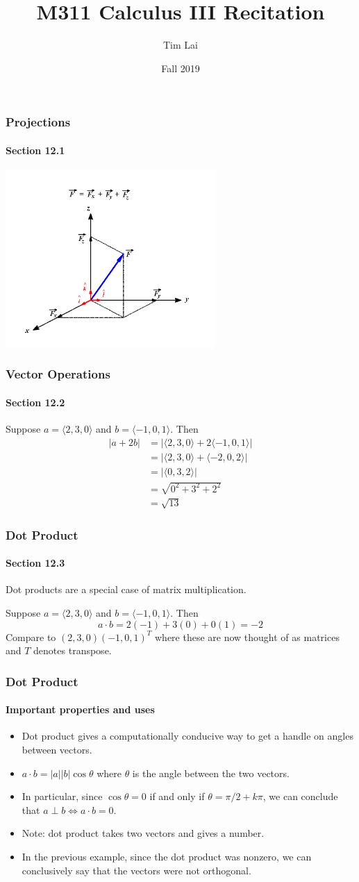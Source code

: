\documentclass[xcolor=svgnames]{beamer}
\begin{document}
\title{M311 Calculus III Recitation}
	\author{Tim Lai }
	\date{Fall 2019}
\frame{\titlepage}
\begin{frame}
\frametitle{Projections}
\framesubtitle{Section 12.1}
\begin{center}
\includegraphics[width=8cm]{3D_vector_component.png}
\end{center}
\end{frame}
\begin{frame}
\frametitle{Vector Operations}
\framesubtitle{Section 12.2}
Suppose $a = \langle 2,3,0 \rangle$ and $b = \langle -1, 0,1 \rangle$. 
Then
\begin{align*}
 |a + 2b| &= |  \langle 2,3,0 \rangle + 2  \langle -1, 0,1 \rangle | \\
&= | \langle 2,3,0 \rangle +\langle -2, 0,2 \rangle | \\
& = | \langle 0,3,2 \rangle | \\
&= \sqrt{0^2 + 3^2 + 2^2} \\
&= \sqrt{13}
\end{align*}
\end{frame}
\begin{frame}
\frametitle{Dot Product}
\framesubtitle{Section 12.3}
Dot products are a special case of matrix multiplication.

Suppose $a = \langle 2,3,0 \rangle$ and $b = \langle -1, 0,1 \rangle$. Then
\[
 a \cdot b = 2(-1) + 3(0) + 0(1) = -2
\]
Compare to $(2,3,0) (-1,0,1)^T$ where these are now thought of as matrices and $T$ denotes transpose. 
\end{frame}
\begin{frame}
\frametitle{Dot Product}
\framesubtitle{Important properties and uses}
\begin{itemize}
	\item Dot product gives a computationally conducive way to get a handle on angles between vectors. 
	\item $a \cdot b = |a||b| \cos \theta$ where $\theta$ is the angle between the two vectors. 
	\item In particular, since $\cos \theta = 0$ if and only if $\theta = \pi / 2 + k \pi$, we can conclude that $a \perp b \Leftrightarrow a \cdot b = 0$. 
	\item Note: dot product takes two vectors and gives a number. 
	\item In the previous example, since the dot product was nonzero, we can conclusively say that the vectors were not orthogonal. 
\end{itemize}
\end{frame}
\end{document}
